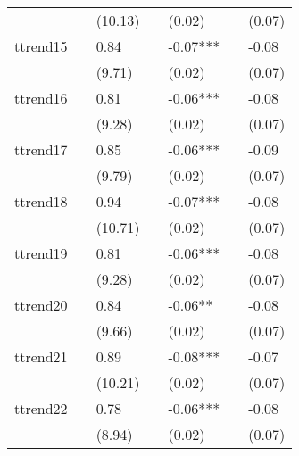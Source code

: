\begin{table}
\begin{center}
\begin{tabular}{lllllll}
                            &              & (10.13)      &              & (0.02)       &              & (0.07)        \\
ttrend15                    &              & 0.84         &              & -0.07***     &              & -0.08         \\
                            &              & (9.71)       &              & (0.02)       &              & (0.07)        \\
ttrend16                    &              & 0.81         &              & -0.06***     &              & -0.08         \\
                            &              & (9.28)       &              & (0.02)       &              & (0.07)        \\
ttrend17                    &              & 0.85         &              & -0.06***     &              & -0.09         \\
                            &              & (9.79)       &              & (0.02)       &              & (0.07)        \\
ttrend18                    &              & 0.94         &              & -0.07***     &              & -0.08         \\
                            &              & (10.71)      &              & (0.02)       &              & (0.07)        \\
ttrend19                    &              & 0.81         &              & -0.06***     &              & -0.08         \\
                            &              & (9.28)       &              & (0.02)       &              & (0.07)        \\
ttrend20                    &              & 0.84         &              & -0.06**      &              & -0.08         \\
                            &              & (9.66)       &              & (0.02)       &              & (0.07)        \\
ttrend21                    &              & 0.89         &              & -0.08***     &              & -0.07         \\
                            &              & (10.21)      &              & (0.02)       &              & (0.07)        \\
ttrend22                    &              & 0.78         &              & -0.06***     &              & -0.08         \\
                            &              & (8.94)       &              & (0.02)       &              & (0.07)        \\

\end{tabular}
\end{center}
\end{table}
